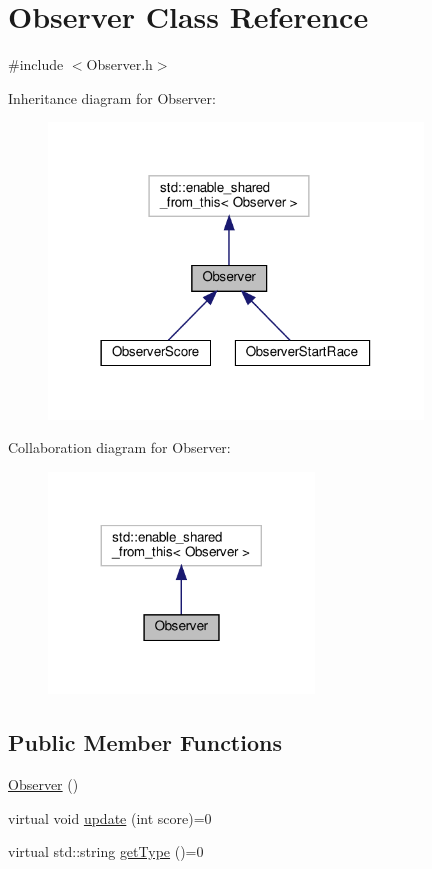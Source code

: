 \hypertarget{classObserver}{}\section{Observer Class Reference}
\label{classObserver}


{\ttfamily \#include $<$Observer.\+h$>$}



Inheritance diagram for Observer\+:\nopagebreak
\begin{figure}[H]
\begin{center}
\leavevmode
\includegraphics[width=282pt]{classObserver__inherit__graph}
\end{center}
\end{figure}


Collaboration diagram for Observer\+:\nopagebreak
\begin{figure}[H]
\begin{center}
\leavevmode
\includegraphics[width=200pt]{classObserver__coll__graph}
\end{center}
\end{figure}
\subsection*{Public Member Functions}
\begin{DoxyCompactItemize}
\item 
\hyperlink{classObserver_a19c43f80a38a332a6f694783df3c9835}{Observer} ()
\item 
virtual void \hyperlink{classObserver_a4b9e6fbc74e7ae6971b2afe462ab5a87}{update} (int score)=0
\item 
virtual std\+::string \hyperlink{classObserver_a92f704d0a3e6e0ade2743da2ae91bcb7}{get\+Type} ()=0
\end{DoxyCompactItemize}



